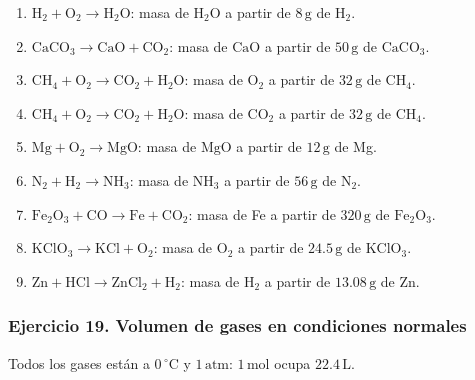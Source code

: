 \begin{enumerate}
    \item[a)] $\mathrm{H_2}+\mathrm{O_2}\rightarrow\mathrm{H_2O}$:
    masa de $\mathrm{H_2O}$ a partir de $8\,\mathrm{g}$ de $\mathrm{H_2}$.

    \item[b)] $\mathrm{CaCO_3}\rightarrow\mathrm{CaO}+\mathrm{CO_2}$:
    masa de $\mathrm{CaO}$ a partir de $50\,\mathrm{g}$ de $\mathrm{CaCO_3}$.

    \item[c)] $\mathrm{CH_4}+\mathrm{O_2}\rightarrow
    \mathrm{CO_2}+\mathrm{H_2O}$:
    masa de $\mathrm{O_2}$ a partir de $32\,\mathrm{g}$ de $\mathrm{CH_4}$.

    \item[d)] $\mathrm{CH_4}+\mathrm{O_2}\rightarrow
    \mathrm{CO_2}+\mathrm{H_2O}$:
    masa de $\mathrm{CO_2}$ a partir de $32\,\mathrm{g}$ de $\mathrm{CH_4}$.

    \item[e)] $\mathrm{Mg}+\mathrm{O_2}\rightarrow\mathrm{MgO}$:
    masa de $\mathrm{MgO}$ a partir de $12\,\mathrm{g}$ de Mg.

    \item[f)] $\mathrm{N_2}+\mathrm{H_2}\rightarrow\mathrm{NH_3}$:
    masa de $\mathrm{NH_3}$ a partir de $56\,\mathrm{g}$ de $\mathrm{N_2}$.

    \item[g)] $\mathrm{Fe_2O_3}+\mathrm{CO}\rightarrow\mathrm{Fe}+\mathrm{CO_2}$:
    masa de Fe a partir de $320\,\mathrm{g}$ de $\mathrm{Fe_2O_3}$.

    \item[h)] $\mathrm{KClO_3}\rightarrow\mathrm{KCl}+\mathrm{O_2}$:
    masa de $\mathrm{O_2}$ a partir de $24.5\,\mathrm{g}$ de $\mathrm{KClO_3}$.

    \item[i)] $\mathrm{Zn}+\mathrm{HCl}\rightarrow\mathrm{ZnCl_2}+\mathrm{H_2}$:
    masa de $\mathrm{H_2}$ a partir de $13.08\,\mathrm{g}$ de Zn.
\end{enumerate}

\subsubsection*{Ejercicio 19. Volumen de gases en condiciones normales}

Todos los gases están a $0\,{}^\circ\mathrm{C}$ y $1\,\mathrm{atm}$:
$1\,\mathrm{mol}$ ocupa $22.4\,\mathrm{L}$.

